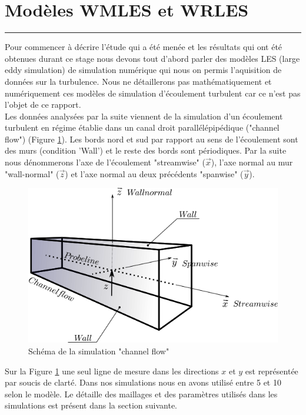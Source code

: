 \documentclass[12pt]{article}   %
\theoremstyle{plain}
\theoremstyle{remark}
\newcommand{\vect}{\overrightarrow}
\begin{document}
\section{Modèles WMLES et WRLES}
\noindent\rule{\linewidth}{2pt}
\vspace{0.1cm}

Pour commencer à décrire l'étude qui a été menée et les résultats qui ont été obtenues durant ce stage nous devons tout d'abord parler des modèles LES (large eddy simulation) de simulation numérique qui nous on permis l'aquisition de données sur la turbulence. Nous ne détaillerons pas mathématiquement et numériquement ces modèles de simulation d'écoulement turbulent car ce n'est pas l'objet de ce rapport. \\

Les données analysées par la suite viennent de la simulation d'un écoulement turbulent en régime établie dans un canal droit parallélépipédique ("channel flow") (Figure \ref{fig:channel_flow}). Les bords nord et sud par rapport au sens de l'écoulement sont des murs (condition 'Wall') et le reste des bords sont périodiques. Par la suite nous dénommerons l'axe de l'écoulement "streamwise" ($\vect{x}$), l'axe normal au mur "wall-normal" ($\vect{z}$) et l'axe normal au deux précédents "spanwise" ($\vect{y}$). \\

\begin{figure}[h!]
	\begin{center}
		\includegraphics[width=0.62\linewidth]{../../report/referance/channel_flow.png}
		\caption{Schéma de la simulation "channel flow"}
		\label{fig:channel_flow}
	\end{center}
\end{figure}

Sur la Figure \ref{fig:channel_flow} une seul ligne de mesure dans les directions $x$ et $y$ est représentée par soucis de clarté. Dans nos simulations nous en avons utilisé entre 5 et 10 selon le modèle. Le détaille des maillages et des paramètres utilisés dans les simulations est présent dans la section suivante. \\
\end{document}
